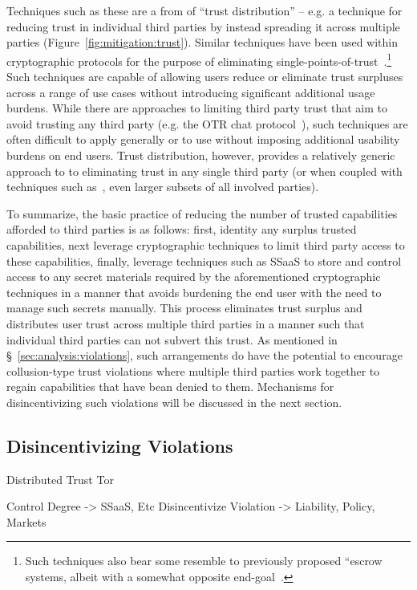 Techniques such as these are a from of ``trust distribution'' --
e.g. a technique for reducing trust in individual third parties by
instead spreading it across multiple parties
(Figure~\ref{fig:mitigation:trust}). Similar techniques have been used
within cryptographic protocols for the purpose of eliminating
single-points-of-trust~\cite{shamir1979}.\footnote{Such techniques
  also bear some resemble to previously proposed ``escrow systems,
  albeit with a somewhat opposite end-goal~\cite{denning1996}.} Such
techniques are capable of allowing users reduce or eliminate trust
surpluses across a range of use cases without introducing significant
additional usage burdens. While there are approaches to limiting third
party trust that aim to avoid trusting any third party (e.g. the OTR
chat protocol~\cite{otr-v3}), such techniques are often difficult to
apply generally or to use without imposing additional usability
burdens on end users. Trust distribution, however, provides a
relatively generic approach to to eliminating trust in any single
third party (or when coupled with techniques such
as~\cite{shamir1979}, even larger subsets of all involved parties).

To summarize, the basic practice of reducing the number of trusted
capabilities afforded to third parties is as follows: first, identity
any surplus trusted capabilities, next leverage cryptographic
techniques to limit third party access to these capabilities, finally,
leverage techniques such as SSaaS to store and control access to any
secret materials required by the aforementioned cryptographic
techniques in a manner that avoids burdening the end user with the
need to manage such secrets manually. This process eliminates trust
surplus and distributes user trust across multiple third parties in a
manner such that individual third parties can not subvert this
trust. As mentioned in \S~\ref{sec:analysis:violations}, such
arrangements do have the potential to encourage collusion-type trust
violations where multiple third parties work together to regain
capabilities that have bean denied to them. Mechanisms for
disincentivizing such violations will be discussed in the next
section.

\subsection{Disincentivizing Violations}


Distributed Trust Tor

Control Degree -> SSaaS, Etc
Disincentivize Violation -> Liability, Policy, Markets

